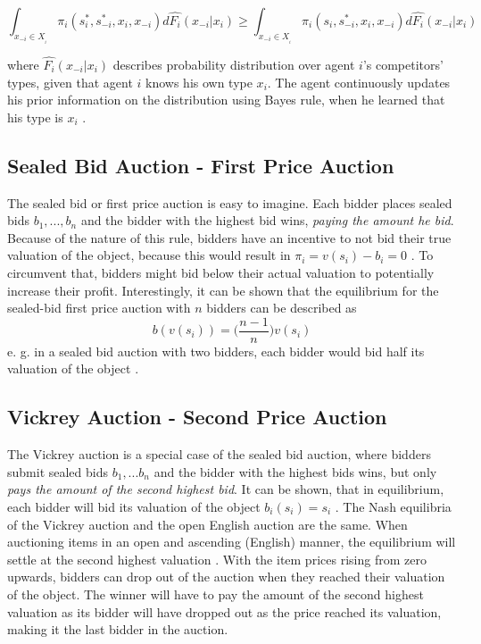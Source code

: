 $$ \int_{x_{-i} \in X_{_i}} \pi_i(s_i^*, s_{-i}^*, x_i, x_{-i}) d\hat{F_i}(x_{-i}|x_i) \geq \int_{x_{-i} \in X_{_i}} \pi_i(s_i, s_{-i}^*, x_i, x_{-i}) d\hat{F_i}(x_{-i}|x_i)  $$
		
where $ \hat{F_i}(x_{-i}|x_i) $ describes probability distribution over agent $ i $'s competitors' types, given that agent $ i $ knows his own type $ x_i $. The agent continuously updates his prior information on the distribution using Bayes rule, when he learned that his type is $ x_i $ \cite[p. 6 f.]{Menezes2005}.

\subsection{Sealed Bid Auction - First Price Auction}
The sealed bid or first price auction is easy to imagine. Each bidder places sealed bids $ b_1, ..., b_n $ and the bidder with the highest bid wins, \textit{paying the amount he bid}. Because of the nature of this rule, bidders have an incentive to not bid their true valuation of the object, because this would result in $ \pi_i = v(s_i) -b_i = 0 $ \cite[p. 3]{Levin2004}. To circumvent that, bidders might bid below their actual valuation to potentially increase their profit. Interestingly, it can be shown that the equilibrium for the sealed-bid first price auction with $ n $ bidders can be described as $$ b(v(s_i)) = \Big( \dfrac{n - 1}{n} \Big) v(s_i)   $$ e. g. in a sealed bid auction with two bidders, each bidder would bid half its valuation of the object \cite{Vickrey1961}.

\subsection{Vickrey Auction - Second Price Auction}
The Vickrey auction is a special case of the sealed bid auction, where bidders submit sealed bids $ b_1,...b_n $ and the bidder with the highest bids wins, but only \textit{pays the amount of the second highest bid}. It can be shown, that in equilibrium, each bidder will bid its valuation of the object $ b_i(s_i) = s_i $ \cite[p. 2]{Levin2004}. 
The Nash equilibria of the Vickrey auction and the open English auction are the same. When auctioning items in an open and ascending (English) manner, the equilibrium will settle at the second highest valuation \cite[p. 2]{Levin2004}. With the item prices rising from zero upwards, bidders can drop out of the auction when they reached their valuation of the object. The winner will have to pay the amount of the second highest valuation as its bidder will have dropped out as the price reached its valuation, making it the last bidder in the auction.

